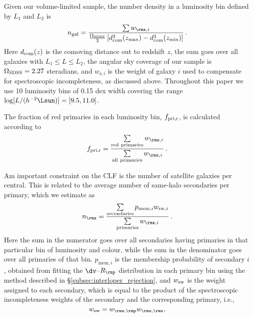 \documentclass[fleqn,usenatbib,useAMS]{mnras}
\begin{document}
	Given our volume-limited sample, the number density in a luminosity bin defined by $L_1$ and $L_2$ is
	\begin{equation}
	n_{\rm gal} = \frac{\sum w_{\rms, i}}{\frac{\Omega_{\rm SDSS}}{3} 
		\left[ d_{\rm com}^3(z_{\rm max}) - d_{\rm com}^3(z_{\rm min})\right]}\,.
	\end{equation}
	Here $d_{\rm com}(z)$ is the comoving distance out to redshift $z$, the sum goes over all galaxies with $L_1 \leq L \leq L_2$, the angular sky coverage of our sample is $\Omega_{\rm SDSS} = 2.27$ steradians, and $w_{\mathrm{s}, i}$ is the weight of galaxy $i$ used to compensate for spectroscopic incompleteness, as discussed above. Throughout this paper we use 10 luminosity bins of 0.15 dex width covering the range $\log[L/(h^{-2}\Lsun)] = [9.5, 11.0]$. 
	
	The fraction of red primaries in each luminosity bin, $f_{\rm pri, r}$, is calculated according to
	\begin{equation}
	f_{\rm pri, r} = \frac{\sum\limits_{\rm red \ primaries}w_{\rms, i}}{\sum\limits_{\rm all \ primaries} w_{\rms, i}}\,.
	\end{equation}
	
	Am important constraint on the CLF is the number of satellite galaxies per central. This is related to the average number of same-halo secondaries per primary, which we estimate as
	\begin{equation}
	n_\rms = \frac{\sum\limits_{\rm secondaries} p_{\mathrm{mem}, i} w_{\mathrm{sw}, i}}{\sum\limits_{\rm primaries} w_{\rms, i}}\,.
	\end{equation}
	Here the sum in the numerator goes over all secondaries having primaries in that particular bin of luminosity and colour, while the sum in the denominator goes over all primaries of that bin. $p_{\mathrm{mem}, i}$ is the membership probability of secondary $i$, obtained from fitting the $\dv$--$R_\rmp$ distribution in each primary bin using the method described in \S\ref{subsec:interloper_rejection}, and $w_{\rm sw}$ is the weight assigned to each secondary, which is equal to the product of the spectroscopic incompleteness weights of the secondary and the corresponding primary, i.e., 
	\begin{equation}
	w_{\rm sw} = w_{\rms, \rmp} w_{\rms, \rms},
	\end{equation}
	
\end{document}

